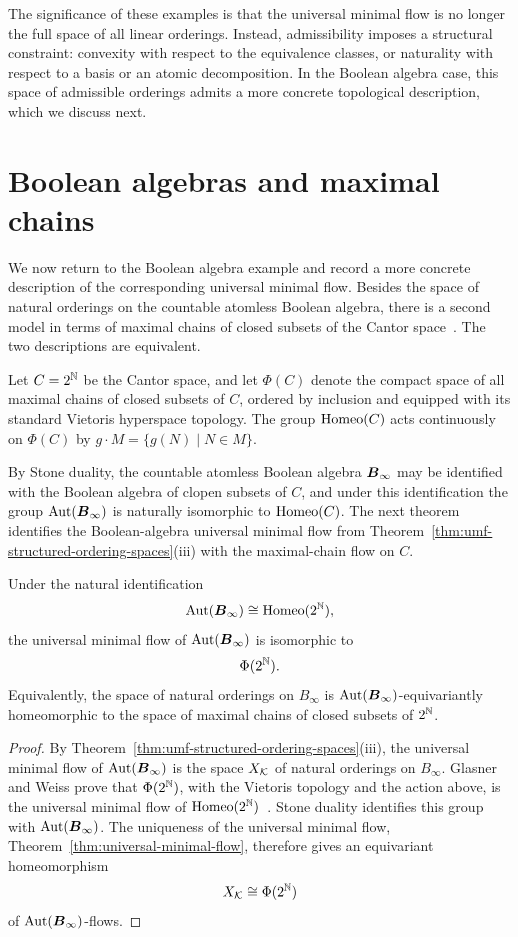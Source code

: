 The significance of these examples is that the universal minimal flow is no longer the full space of all linear orderings. Instead, admissibility imposes a structural constraint: convexity with respect to the equivalence classes, or naturality with respect to a basis or an atomic decomposition. In the Boolean algebra case, this space of admissible orderings admits a more concrete topological description, which we discuss next.

\section{Boolean algebras and maximal chains}

We now return to the Boolean algebra example and record a more concrete description of the corresponding universal minimal flow. Besides the space of natural orderings on the countable atomless Boolean algebra, there is a second model in terms of maximal chains of closed subsets of the Cantor space~\cite{GlW03}. The two descriptions are equivalent.

Let \(C=2^{\mathbb{N}}\) be the Cantor space, and let \(\Phi(C)\) denote the compact space of all maximal chains of closed subsets of \(C\), ordered by inclusion and equipped with its standard Vietoris hyperspace topology. The group \(\operatorname{Homeo}(C)\) acts continuously on \(\Phi(C)\) by
\(g\cdot M=\{g(N)\mid N\in M\}\).

By Stone duality, the countable atomless Boolean algebra \(\boldsymbol{B}_\infty\) may be identified with the Boolean algebra of clopen subsets of \(C\), and under this identification the group \(\operatorname{Aut}(\boldsymbol{B}_\infty)\) is naturally isomorphic to \(\operatorname{Homeo}(C)\).
The next theorem identifies the Boolean-algebra universal minimal flow from Theorem~\ref{thm:umf-structured-ordering-spaces}(iii) with the maximal-chain flow on \(C\).

\begin{theorem}
\label{thm:boolean-maximal-chains}
Under the natural identification
\[
\operatorname{Aut}(\boldsymbol{B}_\infty)\cong \operatorname{Homeo}(2^{\mathbb{N}}),
\]
the universal minimal flow of \(\operatorname{Aut}(\boldsymbol{B}_\infty)\) is isomorphic to
\[
\Phi(2^{\mathbb{N}}).
\]
Equivalently, the space of natural orderings on \(B_\infty\) is \(\operatorname{Aut}(\boldsymbol{B}_\infty)\)-equivariantly homeomorphic to the space of maximal chains of closed subsets of \(2^{\mathbb{N}}\).
\end{theorem}

\begin{proof}
By Theorem~\ref{thm:umf-structured-ordering-spaces}(iii), the universal minimal flow of \(\operatorname{Aut}(\boldsymbol{B}_\infty)\) is the space \(X_{\mathcal{K}}\) of natural orderings on \(B_\infty\). Glasner and Weiss prove that \(\Phi(2^{\mathbb{N}})\), with the Vietoris topology and the action above, is the universal minimal flow of \(\operatorname{Homeo}(2^{\mathbb{N}})\)~\cite{GlW03}. Stone duality identifies this group with \(\operatorname{Aut}(\boldsymbol{B}_\infty)\). The uniqueness of the universal minimal flow, Theorem~\ref{thm:universal-minimal-flow}, therefore gives an equivariant homeomorphism
\[
X_{\mathcal{K}}\cong \Phi(2^{\mathbb{N}})
\]
of \(\operatorname{Aut}(\boldsymbol{B}_\infty)\)-flows.
\end{proof}

